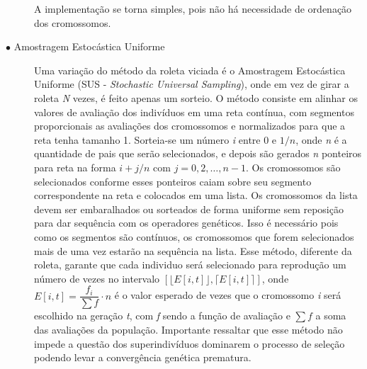 \begin{description}
A implementação se torna simples, pois não há necessidade de ordenação dos cromossomos. 

%

\item[$\bullet$ Amostragem Estocástica Uniforme] \text{}

Uma variação do método da roleta viciada é o Amostragem Estocástica Uniforme (SUS - \textit{Stochastic Universal Sampling}), onde em vez de girar a roleta \textit{N} vezes, é feito apenas um sorteio. O método consiste em alinhar os valores de avaliação dos indivíduos em uma reta contínua, com segmentos proporcionais as avaliações dos cromossomos e normalizados para que a reta tenha tamanho 1. Sorteia-se um número \textit{i} entre 0 e \(1/n\), onde \textit{n} é a quantidade de pais que serão selecionados, e depois são gerados \textit{n} ponteiros para reta na forma \(i + j/n \) com \(j = 0, 2, \dots, n-1 \). Os cromossomos são selecionados conforme esses ponteiros caiam sobre seu segmento correspondente na reta e colocados em uma lista. Os cromossomos da lista devem ser embaralhados ou sorteados de forma uniforme sem reposição para dar sequência com os operadores genéticos. Isso é necessário pois como os segmentos são contínuos, os cromossomos que forem selecionados mais de uma vez estarão na sequência na lista. Esse método, diferente da roleta, garante que cada individuo será selecionado para reprodução um número de vezes no intervalo \(\left[ \lfloor E[i,t] \rfloor , \lceil E[i,t] \rceil \right] \), onde \(E[i,t] = \dfrac{f_i}{\sum f} \cdot n\) é o valor esperado de vezes que o cromossomo \textit{i} será escolhido na geração \textit{t}, com \textit{f} sendo a função de avaliação e \(\sum f\) a soma das avaliações da população. Importante ressaltar que esse método não impede a questão dos superindivíduos dominarem o processo de seleção podendo levar a convergência genética prematura. 


\end{description}
